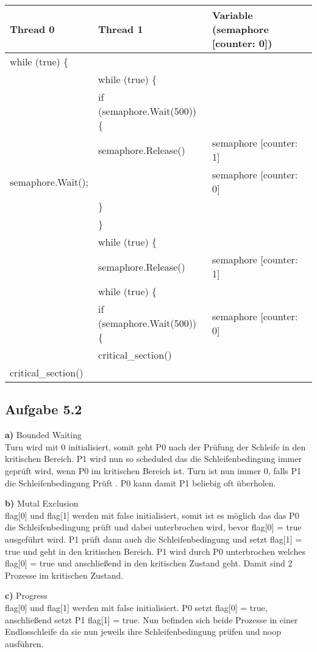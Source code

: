 \documentclass[a4paper,graphics,11pt]{article}
\newcommand{\aufgabe}[1]{\subsection*{Aufgabe #1}}
\begin{document}
{{{{\tiny
\begin{tabular}{l | l | l}
Thread 0 		& Thread 1		&  Variable (semaphore [counter: 0])	\\
\toprule
while (true) \{  & 			&			\\
\midrule
& 	while (true) \{&			\\
\midrule
& 	if (semaphore.Wait(500)) \{	& 	 		\\
\midrule
	&  	 semaphore.Release() & 	semaphore [counter: 1]	\\
\midrule
semaphore.Wait();	& 	&	semaphore [counter: 0] \\
\midrule
			& \}	&	\\
\midrule
	& \}	& 			\\
\midrule 
& while (true) \{ & \\
\midrule
 &  semaphore.Release() & 	semaphore [counter: 1]	\\
\midrule
& 	while (true) \{&			\\
\midrule
& 	if (semaphore.Wait(500)) \{	& semaphore [counter: 0] \\
\midrule
& critical\_section() & \\
\midrule
critical\_section() & \\
\bottomrule
\end{tabular}

\aufgabe{5.2}

\textbf{a)}
Bounded Waiting \\
Turn wird mit 0 initialisiert, somit geht P0 nach der Prüfung der Schleife in den kritischen Bereich. P1 wird nun so scheduled das die Schleifenbedingung immer geprüft wird, wenn P0 im kritischen Bereich ist. Turn ist nun immer 0, falls P1 die Schleifenbedingung Prüft . P0 kann damit P1 beliebig oft überholen.

\textbf{b)}
 Mutal Exclusion \\
 flag[0] und flag[1] werden mit false initialisiert, somit ist es möglich das das P0 die Schleifenbedingung prüft und dabei unterbrochen wird, bevor flag[0] = true ausgeführt wird. P1 prüft dann auch die Schleifenbedingung und setzt flag[1] = true und geht in den kritischen Bereich. P1 wird durch P0 unterbrochen welches flag[0] = true und anschließend in den kritischen Zustand geht. Damit sind 2 Prozesse im kritischen Zustand.
 
 \textbf{c)}
 Progress \\
 flag[0] und flag[1] werden mit false initialisiert. P0 setzt flag[0] = true, anschließend setzt P1 flag[1] = true. Nun befinden sich beide Prozesse in einer Endlosschleife da sie nun jeweils ihre Schleifenbedingung prüfen und noop ausführen.
 
}}}}
\end{document}
